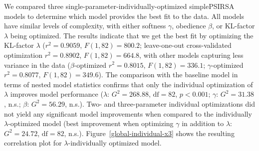 \documentclass[11pt,a4paper]{article}
\begin{document}



We compared three single-parameter-individually-optimized simplePSIRSA models to determine which model provides the best fit to the data. 
All models have similar levels of complexity, with either softness $\gamma$, obedience $\beta$, or KL-factor $\lambda$ being optimized.
The results indicate that we get the best fit by optimizing the KL-factor $\lambda$ ($r^{2}=0.9059$, $F(1,82) = 800.2$; leave-one-out cross-validated optimization $r^{2}=0.8902$, $F(1,82) = 664.8$, with other models capturing less variance in the data ($\beta$-optimized $r^{2}=0.8015$, $F(1,82) = 336.1$; $\gamma$-optimized $r^{2}=0.8077$, $F(1,82) = 349.6$).
The comparison with the baseline model in terms of nested model statistics confirms that only the individual optimization of $\lambda$ improves model performance ($\lambda$: $G^2=268.88$, $\textrm{df}=82$, $p<0.001$; $\gamma$: $G^2=31.38$, n.s.; $\beta$: $G^2=56.29$, n.s.).
Two- and three-parameter individual optimizations did not yield any significant model improvements when compared to the individually $\lambda$-optimized model (best improvement when optimizing $\gamma$ in addition to $\lambda$: $G^2=24.72$, $\textrm{df}=82$, n.s.).
Figure~\ref{global-individual-x3} shows the resulting correlation plot for $\lambda$-individually optimized model. 
 
\end{document}
